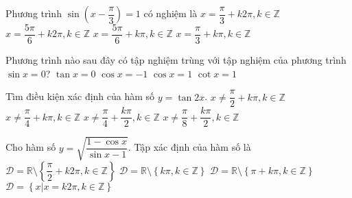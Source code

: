 \begin{ex}%
	Phương trình $ \sin \left(x-\dfrac{\pi}{3}\right)=1 $ có nghiệm là
	\choice
	{$x=\dfrac{\pi}{3}+k2\pi,  k\in \mathbb{Z} $}
	{\True $x=\dfrac{5\pi}{6}+k2\pi,  k\in \mathbb{Z}   $}
	{$x=\dfrac{5\pi}{6}+k\pi,  k\in \mathbb{Z}   $}
	{$x=\dfrac{\pi}{3}+k\pi,  k\in \mathbb{Z}  $}
\end{ex}
\begin{ex}%
	Phương trình nào sau đây có tập nghiệm trùng với tập nghiệm của phương trình $ \sin x=0 $?
	\choice
	{\True $\tan x=0 $}
	{$\cos x=-1  $}
	{$\cos x=1  $}
	{$\cot x=1 $}
\end{ex}
\begin{ex}%
	Tìm điều kiện xác định của hàm số $ y=\tan 2x $.
	\choice
	{$x\ne \dfrac{\pi}{2}+k\pi, k \in \mathbb{Z}  $}
	{$x\ne \dfrac{\pi}{4}+k\pi, k \in \mathbb{Z}   $}
	{\True $x\ne \dfrac{\pi}{4}+\dfrac{k\pi}{2}, k \in \mathbb{Z}   $}
	{$x\ne \dfrac{\pi}{8}+\dfrac{k\pi}{2}, k \in \mathbb{Z}  $}
\end{ex}
\begin{ex}%
	Cho hàm số $ y=\sqrt{\dfrac{1-\cos x}{\sin x-1}} $. Tập xác định của hàm số là
	\choice
	{$ \mathscr D=\mathbb{R} \setminus \left\{\dfrac{\pi}{2}+k2\pi, k\in \mathbb{Z}\right\}$}
	{$ \mathscr D=\mathbb{R} \setminus \left\{k\pi, k\in \mathbb{Z}\right\}$}
	{$ \mathscr D=\mathbb{R} \setminus \left\{\pi+k\pi, k\in \mathbb{Z}\right\}$}
	{\True $ \mathscr D=\left\{x|x=k2\pi, k\in \mathbb{Z}\right\}$}
\end{ex}

